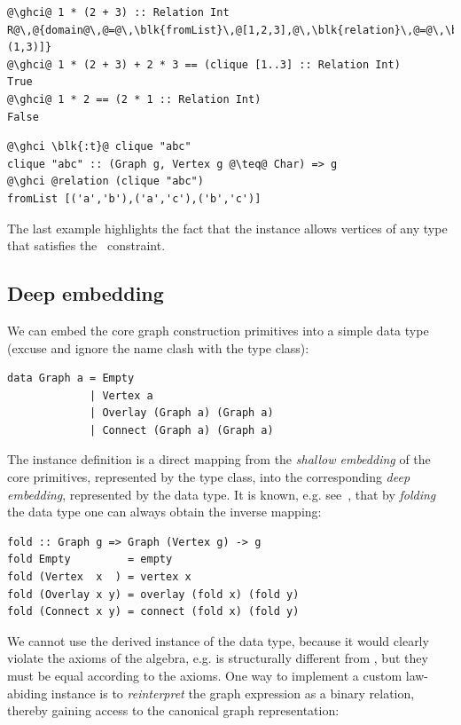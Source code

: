 \begin{verbatim}
@\ghci@ 1 * (2 + 3) :: Relation Int
R@\,@{domain@\,@=@\,\blk{fromList}\,@[1,2,3],@\,\blk{relation}\,@=@\,\blk{fromList}\,@[(1,2),(1,3)]}
@\ghci@ 1 * (2 + 3) + 2 * 3 == (clique [1..3] :: Relation Int)
True
@\ghci@ 1 * 2 == (2 * 1 :: Relation Int)
False
\end{verbatim}
\begin{verbatim}
@\ghci \blk{:t}@ clique "abc"
clique "abc" :: (Graph g, Vertex g @\teq@ Char) => g
@\ghci @relation (clique "abc")
fromList [('a','b'),('a','c'),('b','c')]
\end{verbatim}

\noindent
The last example highlights the fact that the  instance allows vertices
of any type  that satisfies the~ constraint.

\subsection{Deep embedding}\label{sub-embedding}

We can embed the core graph construction primitives into a simple data type
(excuse and ignore the name clash with the type class):

\begin{verbatim}
data Graph a = Empty
             | Vertex a
             | Overlay (Graph a) (Graph a)
             | Connect (Graph a) (Graph a)
\end{verbatim}

The instance definition is a direct mapping from the \emph{shallow embedding}
of the core primitives, represented by the type class, into the
corresponding \emph{deep embedding}, represented by the data type.
It is known, e.g. see~\citet{2014_gibbons_folding}, that by \emph{folding} the data
type one can always obtain the inverse mapping:

\begin{verbatim}
fold :: Graph g => Graph (Vertex g) -> g
fold Empty         = empty
fold (Vertex  x  ) = vertex x
fold (Overlay x y) = overlay (fold x) (fold y)
fold (Connect x y) = connect (fold x) (fold y)
\end{verbatim}

We cannot use the derived  instance of the  data type, because it
would clearly violate the axioms of the algebra, e.g.  is
structurally different from , but they must be equal according to the axioms.
One way to implement a custom law-abiding  instance is to \emph{reinterpret}
the graph expression as a binary relation, thereby gaining access to the canonical
graph representation:

